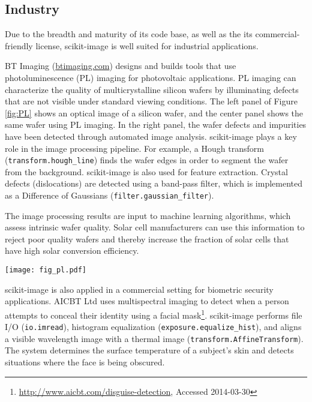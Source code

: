 
  \subsection*{Industry}
    \label{industry}

    Due to the breadth and maturity of its code base, as well as the its commercial-friendly license, scikit-image is well suited for industrial applications.

    BT Imaging (\url{btimaging.com}) designs and builds tools that use photoluminescence (PL) imaging for photovoltaic applications. PL imaging can characterize the quality of multicrystalline silicon wafers by illuminating defects that are not visible under standard viewing conditions. The left panel of Figure \ref{fig:PL} shows an optical image of a silicon wafer, and the center panel shows the same wafer using PL imaging. In the right panel, the wafer defects and impurities have been detected through automated image analysis. scikit-image plays a key role in the image processing pipeline. For example, a Hough transform (\texttt{transform.hough\_line}) finds the wafer edges in order to segment the wafer from the background. scikit-image is also used for feature extraction. Crystal defects (dislocations) are detected using a band-pass filter, which is implemented as a Difference of Gaussians (\texttt{filter.gaussian\_filter}).

    The image processing results are input to machine learning algorithms, which assess intrinsic wafer quality. Solar cell manufacturers can use this information to reject poor quality wafers and thereby increase the fraction of solar cells that have high solar conversion efficiency.

    \begin{figure*}[bht]

      \texttt{[image: fig\_pl.pdf]}

      \caption{\textit{Left}: An image of an as-cut silicon wafer before it has been processed into a solar cell. \textit{Center}: A PL image of the same wafer. Wafer defects, which have a negative impact solar cell efficiency, are visible as dark regions. \textit{Right}: Image processing results. Defects in the crystal growth (dislocations) are colored blue, while red indicates the presence of impurities. \label{fig:PL}}
    \end{figure*}

    scikit-image is also applied in a commercial setting for biometric security applications. AICBT Ltd uses multispectral imaging to detect when a person attempts to conceal their identity using a facial mask\footnote{\url{http://www.aicbt.com/disguise-detection}, Accessed 2014-03-30}. scikit-image performs file I/O (\texttt{io.imread}), histogram equalization (\texttt{exposure.equalize\_hist}), and aligns a visible wavelength image with a thermal image (\texttt{transform.AffineTransform}). The system determines the surface temperature of a subject's skin and detects situations where the face is being obscured.
